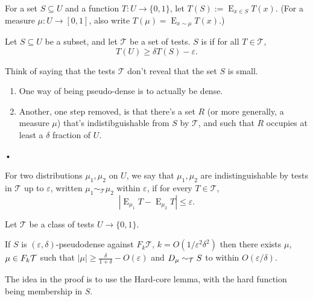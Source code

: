 \begin{df}
For a set $S\subseteq U$ and a function $T:U \to \{0,1\}$,  let $T(S):=\operatorname{E}_{x\in S} T(x)$. (For a measure $\mu: U\to [0,1]$, also write $T(\mu) = \operatorname{E}_{x\sim \mu} T(x)$.)

Let $S\subseteq U$ be a subset, and let $\mathcal T$ be a set of tests. $S$ is  if for all $T\in \mathcal T$, 
$$
T(U) \ge \delta T(S)-\varepsilon.
$$
\end{df}
Think of saying that the tests $\mathcal T$ don't reveal that the set $S$ is small. 
\begin{enumerate}
\item
One way of being pseudo-dense is to actually be dense.
\item
Another, one step removed, is that there's a set $R$ (or more generally, a measure $\mu$) that's
indistibguishable from $S$ by $\mathcal T$, and such that $R$ occupies at least a $\delta$ fraction of $U$.
\end{enumerate}•
\begin{df}
For two distributions $\mu_1,\mu_2$ on $U$, we say that $\mu_1,\mu_2$ are indistinguishable by tests in  $\mathcal T$ up to $\varepsilon$, written $\mu_1 \sim_{\mathcal T} \mu_2$ within $\varepsilon$, if for every $T\in \mathcal T$, 
$$
|\operatorname{E}_{\mu_1}T - \operatorname{E}_{\mu_2} T| \le \varepsilon.
$$
\end{df}
\begin{thm}\label{thm:dmt}
Let $\mathcal T$ be a class of tests $U\to \{0,1\}$. 

If $S$ is $(\varepsilon,\delta)$-pseudodense against $F_k\mathcal T$, $k=O(1/\varepsilon^2\delta^2)$ then there exists $\mu$, $\mu\in F_k\cal T$ such that $|\mu|\ge \frac{\delta}{1+\delta}-O(\varepsilon)$ and $D_\mu\sim_{\cal T} S$ to within $O(\varepsilon/\delta)$. 
\end{thm}
The idea in the proof is to use the Hard-core lemma, with the hard function being membership in $S$.
